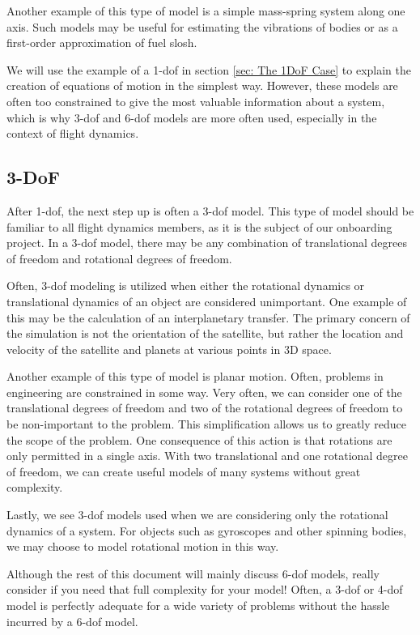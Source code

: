 \documentclass[12pt]{report}
\begin{document}
Another example of this type of model is a simple mass-spring system along one axis. Such models may be useful for estimating the vibrations of bodies or as a first-order approximation of fuel slosh.

We will use the example of a 1-\gls{dof} in section \ref{sec: The 1DoF Case} to explain the creation of equations of motion in the simplest way. However, these models are often too constrained to give the most valuable information about a system, which is why 3-\gls{dof} and 6-\gls{dof} models are more often used, especially in the context of flight dynamics.
\subsection{3-DoF}
After 1-\gls{dof}, the next step up is often a 3-\gls{dof} model. This type of model should be familiar to all flight dynamics members, as it is the subject of our onboarding project. In a 3-\gls{dof} model, there may be any combination of translational degrees of freedom and rotational degrees of freedom.

Often, 3-\gls{dof} modeling is utilized when either the rotational dynamics or translational dynamics of an object are considered unimportant. One example of this may be the calculation of an interplanetary transfer. The primary concern of the simulation is not the orientation of the satellite, but rather the location and velocity of the satellite and planets at various points in 3D space. 

Another example of this type of model is planar motion. Often, problems in engineering are constrained in some way. Very often, we can consider one of the translational degrees of freedom and two of the rotational degrees of freedom to be non-important to the problem. This simplification allows us to greatly reduce the scope of the problem. One consequence of this action is that rotations are only permitted in a single axis. With two translational and one rotational degree of freedom, we can create useful models of many systems without great complexity.

Lastly, we see 3-\gls{dof} models used when we are considering only the rotational dynamics of a system. For objects such as gyroscopes and other spinning bodies, we may choose to model rotational motion in this way.

Although the rest of this document will mainly discuss 6-\gls{dof} models, really consider if you need that full complexity for your model! Often, a 3-\gls{dof} or 4-\gls{dof} model is perfectly adequate for a wide variety of problems without the hassle incurred by a 6-\gls{dof} model. 
\end{document}

